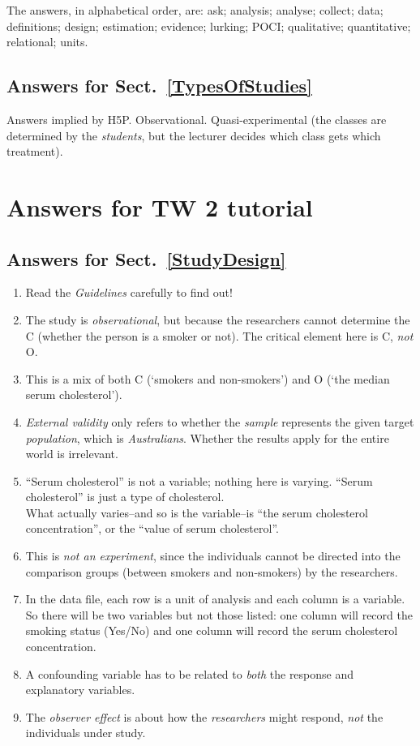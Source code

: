 \documentclass[
  11pt,
  a4paper,
  krantz2]{krantz}
\providecommand{\tightlist}{%
  \setlength{\itemsep}{0pt}\setlength{\parskip}{0pt}}
\begin{document}
\begin{footnotesize}
The answers, in alphabetical order, are: ask; analysis; analyse; collect; data; definitions; design; estimation; evidence; lurking; POCI; qualitative; quantitative; relational; units.

\subsection*{Answers for Sect.~\ref{TypesOfStudies}}\label{answers-for-sect.-reftypesofstudies}

Answers implied by H5P.
Observational.
Quasi-experimental (the classes are determined by the \emph{students}, but the lecturer decides which class gets which treatment).

\section{Answers for TW 2 tutorial}\label{Lecture2Answers}

\subsection*{Answers for Sect.~\ref{StudyDesign}}\label{answers-for-sect.-refstudydesign}

\begin{enumerate}
\def\labelenumi{\arabic{enumi}.}
\tightlist
\item
  Read the \emph{Guidelines} carefully to find out!
\item
  The study is \emph{observational}, but because the researchers cannot determine the C (whether the person is a smoker or not).
  The critical element here is C, \emph{not} O.
\item
  This is a mix of both C (`smokers and non-smokers') and O (`the median serum cholesterol').
\item
  \emph{External validity} only refers to whether the \emph{sample} represents the given target \emph{population}, which is \emph{Australians}.
  Whether the results apply for the entire world is irrelevant.
\item
  ``Serum cholesterol'' is not a variable; nothing here is varying. ``Serum cholesterol'' is just a type of cholesterol.\\
  What actually varies--and so is the variable--is ``the serum cholesterol concentration'', or the ``value of serum cholesterol''.
\item
  This is \emph{not an experiment}, since the individuals cannot be directed into the comparison groups (between smokers and non-smokers) by the researchers.
\item
  In the data file, each row is a unit of analysis and each column is a variable.
  So there will be two variables but not those listed: one column will record the smoking status (Yes/No) and one column will record the serum cholesterol concentration.
\item
  A confounding variable has to be related to \emph{both} the response and explanatory variables.
\item
  The \emph{observer effect} is about how the \emph{researchers} might respond, \emph{not} the individuals under study.
\end{enumerate}


\end{footnotesize}
\end{document}
